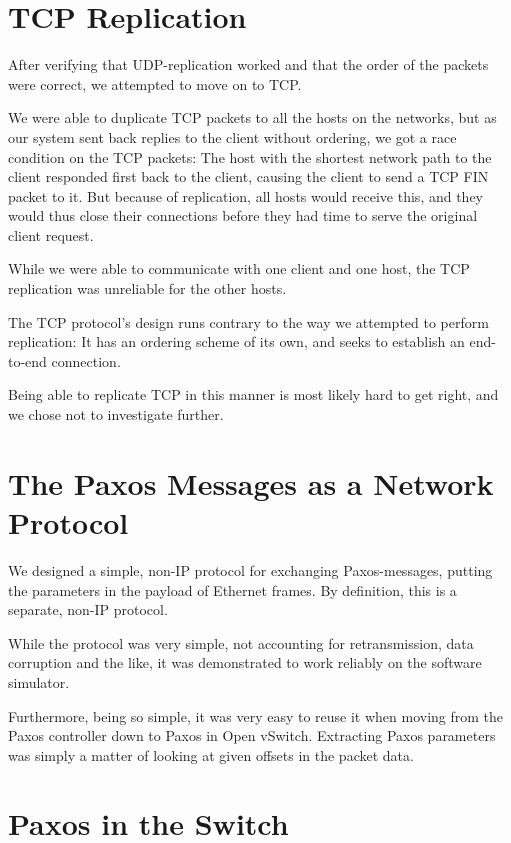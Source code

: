 \section{TCP Replication}
\label{chapter:tcp.replication}

After verifying that UDP-replication worked and that the order of the
packets were correct, we attempted to move on to TCP.

We were able to duplicate TCP packets to all the hosts on the networks, but
as our system sent back replies to the client without ordering, we got a
race condition on the TCP packets:  The host with the shortest network path
to the client responded first back to the client, causing the client to send
a TCP FIN packet to it.  But because of replication, all hosts would receive
this, and they would thus close their connections before they had time to
serve the original client request.

While we were able to communicate with one client and one host,
the TCP replication was unreliable for the other hosts.

The TCP protocol's design runs contrary to the way we attempted to perform
replication:  It has an ordering scheme of its own, and seeks to establish
an end-to-end connection.

Being able to replicate TCP in this manner is most likely hard to get right,
and we chose not to investigate further.

\section{The Paxos Messages as a Network Protocol}

We designed a simple, non-IP protocol for exchanging Paxos-messages, putting
the parameters in the payload of Ethernet frames.  By definition, this is a
separate, non-IP protocol.

While the protocol was very simple, not accounting for retransmission,
data corruption and the like, it was demonstrated to work reliably on the
software simulator.

Furthermore, being so simple, it was very easy to reuse it when moving from
the Paxos controller down to Paxos in Open vSwitch.  Extracting Paxos
parameters was simply a matter of looking at given offsets in the packet
data.

\section{Paxos in the Switch}

